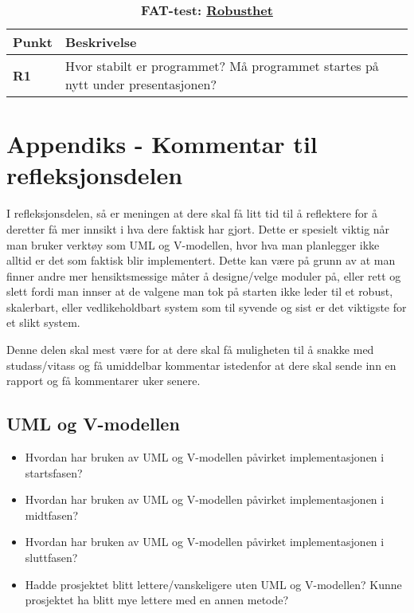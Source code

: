 \begin{table}[H]
    \centering
    \caption*{\textbf{\textcolor{RWTHrot100}{FAT-test}: \underline{Robusthet}}}
    \begin{tabular}{@{}  |p{1.25cm}| p{12.25cm}|  @{}}
    \hline
      \textbf{Punkt}             & \textbf{Beskrivelse} \\
    \hline
    \textbf{\textcolor{RWTHrot100}{R1}} & Hvor stabilt er programmet? Må programmet startes på nytt under presentasjonen?\\\cline{1-2} 
    \end{tabular}
\end{table}

\section{Appendiks - Kommentar til refleksjonsdelen }\label{app:refleksjon}

I refleksjonsdelen, så er meningen at dere skal få litt tid til å reflektere for å deretter få mer innsikt i hva dere faktisk har gjort. Dette er spesielt viktig når man bruker verktøy som UML og V-modellen, hvor hva man planlegger ikke alltid er det som faktisk blir implementert. Dette kan være på grunn av at man finner andre mer hensiktsmessige måter å designe/velge moduler på, eller rett og slett fordi man innser at de valgene man tok på starten ikke leder til et robust, skalerbart, eller vedlikeholdbart system som til syvende og sist er det viktigste for et slikt system. 

Denne delen skal mest være for at dere skal få muligheten til å snakke med studass/vitass og få umiddelbar kommentar istedenfor at dere skal sende inn en rapport og få kommentarer uker senere.


\subsection{UML og V-modellen}
\begin{itemize}
    \item Hvordan har bruken av UML og V-modellen påvirket implementasjonen i startsfasen?
    \item Hvordan har bruken av UML og V-modellen påvirket implementasjonen i midtfasen?
    \item Hvordan har bruken av UML og V-modellen påvirket implementasjonen i sluttfasen?
    \item Hadde prosjektet blitt lettere/vanskeligere uten UML og V-modellen? Kunne prosjektet ha blitt mye lettere med en annen metode?
\end{itemize}


